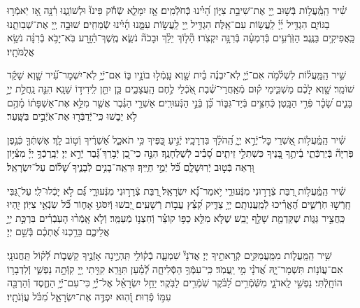 \documentclass[twoside, openany, parskip=half, 11pt]{book}
\begin{document}
שִׁ֗יר הַֽמַּֽ֫עֲל֥וֹת בְּֿשׁ֣וּב יְ֖יָ אֶת־שִׁיבַ֣ת צִיּ֑וֹן הָ֝יִ֗ינוּ כְּֿחֹלְֿמִֽים׃ אָ֤ז יִמָּלֵ֢א שְֿׂחֹ֡ק פִּינוּ֘ וּלְשׁוֹנֵ֢נוּ רִ֫נָּ֥ה אָ֭ז יֹֽאמְֿר֣וּ בַגּוֹיִ֑ם הִגְדִּ֥יל יְ֜יָ֗ לַֽעֲשׂ֥וֹת עִם־אֵֽלֶּה׃ הִגְדִּ֥יל יְ֖יָ לַֽעֲשׂ֣וֹת עִמָּ֑נוּ הָ֜יִ֗ינוּ שְֿׂמֵחִֽים׃ שׁוּבָ֣ה יְ֖יָ אֶת־שְׁבִותֵ֑נוּ כַּֽאֲפִיקִ֥ים בַּנֶּֽגֶב׃ הַזֹּֽרְֿעִ֥ים בְּֿדִמְעָ֗ה בְּֿרִנָּ֥ה יִקְצֹֽרוּ׃ הָ֘ל֤וֹךְ יֵלֵ֨ךְ וּבָכֹה֘ נֹשֵׂ֢א מֶֽשֶׁךְ־הַ֫זָּ֥רַע בֹּֽא־יָבֹ֥א בְֿרִנָּ֗ה נֹשֵׂ֥א אֲלֻמֹּתָֽיו׃

שִׁ֥יר הַֽמַּֽעֲל֗וֹת לִשְׁלֹ֫מֹ֥ה אִם־יְֿיָ֤ לֹֽא־יִבְנֶ֬ה בַ֗יִת שָׁ֤וְא עָֽמְֿל֣וּ בוֹנָ֣יו בּ֑וֹ אִם־יְֿיָ֥ לֹֽא־יִשְׁמָר־עִ֝֗יר שָׁ֤וְא שָׁקַ֬ד שׁוֹמֵֽר׃ שָׁ֤וְא לָכֶ֨ם מַשְׁכִּ֑ימֵי ק֡וּם מְֿאַֽחֲרֵי־שֶׁ֗בֶת אֹֽ֭כְֿלֵי לֶ֣חֶם הָֽעֲצָבִ֑ים כֵּ֤ן יִתֵּ֖ן לִֽידִיד֣וֹ שֵׁנָֽא׃ הִנֵּ֤ה נַֽחֲלַ֣ת יְיָ֣ בָּנִ֑ים שָׂ֝כָ֗ר פְּֿרִ֣י הַבָּֽטֶן׃ כְּֿחִצִּ֥ים בְּֿיַד־גִּבּ֑וֹר כֵּ֝֗ן בְּֿנֵ֣י הַנְּֿעוּרִֽים׃ אַשְׁרֵ֤י הַגֶּ֗בֶר אֲשֶׁ֤ר מִלֵּ֥א אֶת־אַשְׁפָּת֗וֹ מֵ֫הֶ֥ם לֹ֥א יֵב֑שׁוּ כִּֽי־יְֿדַבְּֿר֖וּ אֶת־אֹֽיְֿבִ֣ים בַּשָּֽׁעַר׃

שִׁ֗יר הַֽמַּֽ֫עֲל֥וֹת אַ֭שְׁרֵי כׇּל־יְֿרֵ֣א יְיָ֑ הַֽ֝הֹלֵ֗ךְ בִּדְרָכָֽיו׃ יְֿגִ֣יעַ כַּ֭פֶּיךָ כִּ֥י תֹאכֵ֑ל אַ֝שְׁרֶ֗יךָ וְֿט֣וֹב לָֽךְ׃ אֶשְׁתְּֿךָ֤ כְּֿגֶ֥פֶן פֹּֽרִיָּה֘ בְּֿיַרְכְּֿתֵ֢י בֵ֫יתֶ֥ךָ בָּ֭נֶיךָ כִּשְׁתִלֵ֣י זֵיתִ֑ים סָ֝בִ֗יב לְֿשֻׁלְחָנֶֽךָ׃ הִנֵּ֣ה כִי־כֵ֭ן יְֿבֹ֥רַךְ ֝גָּ֗בֶר יְֿרֵ֣א יְיָ׃ יְֿבָֽרֶכְֿךָ֥ יְיָ֗ מִצִּ֫יּ֥וֹן וּ֭רְאֵה בְּֿט֣וּב יְֿרֽוּשָׁלָ֑םִ כֹּ֝֗ל יְֿמֵ֣י חַיֶּֽיךָ׃ וּרְאֵֽה־בָנִ֥ים לְֿבָנֶ֑יךָ שָׁ֝ל֗וֹם עַל־יִשְׂרָאֵֽל׃

שִׁ֗יר הַֽמַּֽ֫עֲל֥וֹת רַ֭בַּת צְֿרָר֣וּנִי מִנְּֿעוּרַ֑י יֹ֥אמַר־נָ֝֗א יִשְׂרָאֵֽל׃ רַ֭בַּת צְֿרָר֣וּנִי מִנְּֿעוּרָ֑י גַּ֝֗ם לֹ֣א יָכְֿלוּ־לִֽי׃ עַל־גַּ֭בִּי חָֽרְֿשׁ֣וּ חֹֽרְֿשִׁ֑ים הֶ֝אֱרִ֗יכוּ לְֿמַֽעֲנִותָֽם׃ יְיָ֥ צַדִּ֑יק קִ֝צֵּ֗ץ עֲב֣וֹת רְֿשָׁעִֽים׃ יֵ֭בשׁוּ וְֿיִסֹּגוּ֣ אָח֑וֹר כֹּ֝֗ל שֽׂנְֿאֵ֥י צִיּֽוֹן׃ יִֽ֭הְיוּ כַּֽחֲצִ֣יר גַּגּ֑וֹת שֶׁקַּדְמַ֖ת שָׁלַ֣ף יָבֵֽשׁ׃ שֶׁלֹּ֤א מִלֵּ֖א כַפּ֥וֹ קוֹצֵ֗ר וְֿחִצְנ֥וֹ מְֿעַמֵּֽר׃ וְֿלֹ֤א אָֽמְֿר֨וּ הָעֹֽבְֿרִ֗ים בִּרְכַּ֣ת יְיָ֣ אֲלֵיכֶ֑ם בֵּרַ֥כְנוּ אֶ֝תְכֶ֗ם בְּֿשֵׁ֣ם יְיָ׃

שִׁ֥יר הַֽמַּֽעֲל֑וֹת מִמַּֽעֲמַקִּ֖ים קְֿרָאתִ֣יךָ יְיָ׃ אֲדֹנָי֘ שִׁמְעָ֢ה בְֿק֫וֹלִ֥י תִּֽהְיֶ֣ינָה אָזְֿנֶ֣יךָ קַשֻּׁב֑וֹת לְֿ֝ק֗וֹל תַּֽחֲנוּנָֽי׃ אִם־עֲוֹנ֥וֹת תִּשְׁמָר־יָ֑הּ אֲ֝דֹנָ֗י מִ֣י יַֽעֲמֹֽד׃ כִּֽי־עִמְּֿךָ֥ הַסְּֿלִיחָ֑ה לְֿ֝מַ֗עַן תִּוָּרֵֽא׃ קִוִּ֣יתִי יְ֖יָ קִוְּֿתָ֣ה נַפְשִׁ֑י וְֽֿלִדְבָר֥וֹ הוֹחָֽלְֿתִּי׃ נַפְשִׁ֣י לַֽאדֹנָ֑י מִשֹּֽֿׁמְֿרִ֥ים לַ֝בֹּ֗קֶר שֹֽׁמְֿרִ֥ים לַבֹּֽקֶר׃ יַחֵ֥ל יִשְׂרָאֵ֗ל אֶל־יְֿ֫יָ֥ כִּי־עִם־יְֿיָ֥ הַחֶ֑סֶד וְֿהַרְבֵּ֖ה עִמּ֣וֹ פְֿדֽוּת׃ וְֿ֭הֽוּא יִפְדֶּ֣ה אֶת־יִשְׂרָאֵ֑ל מִ֝כֹּ֗ל עֲוֹֽנֹתָֽיו׃
\end{document}
